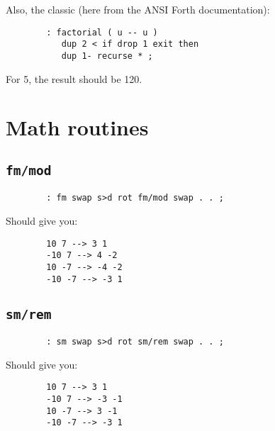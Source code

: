 Also, the classic (here from the ANSI Forth documentation):

\begin{lstlisting}
        : factorial ( u -- u ) 
           dup 2 < if drop 1 exit then 
           dup 1- recurse * ;
\end{lstlisting}

For 5, the result should be 120.



\section{Math routines}



\subsection{\texttt{fm/mod}}

\begin{lstlisting}
        : fm swap s>d rot fm/mod swap . . ; 
\end{lstlisting}

Should give you: 
\begin{lstlisting}
        10 7 --> 3 1
        -10 7 --> 4 -2 
        10 -7 --> -4 -2
        -10 -7 --> -3 1
\end{lstlisting}


\subsection{\texttt{sm/rem}}

\begin{lstlisting}
        : sm swap s>d rot sm/rem swap . . ; 
\end{lstlisting}

Should give you: 
\begin{lstlisting}
        10 7 --> 3 1
        -10 7 --> -3 -1 
        10 -7 --> 3 -1
        -10 -7 --> -3 1
\end{lstlisting}
